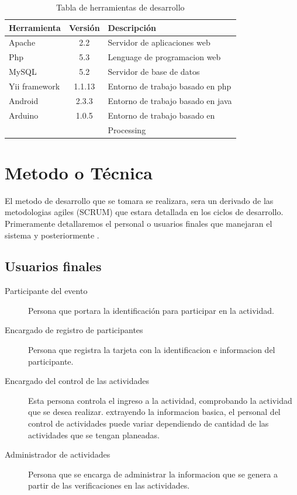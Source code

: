 \documentclass[letter,12pt]{article}
\begin{document}
	\begin{table}[H]
		\begin{tabular}{l|c|l}
			Herramienta       & Versi\'on   & Descripci\'on					   \\
			\hline
			Apache 			  & 2.2			& Servidor de aplicaciones web     \\
			Php				  & 5.3			& Lenguage de programacion web     \\
			MySQL             & 5.2			& Servidor de base de datos        \\
			Yii framework     & 1.1.13  	& Entorno de trabajo basado en php \\
			Android           & 2.3.3		& Entorno de trabajo basado en java\\
			Arduino 		  & 1.0.5		& Entorno de trabajo basado en     \\
							  &             & Processing					   \\	
		\end{tabular}
		\caption{ Tabla de herramientas de desarrollo}
		\label{herramienta_desarrollo}
	\end{table}

\section{Metodo o Técnica}

El metodo de desarrollo que se tomara se realizara, sera un derivado de las metodologias agiles (SCRUM) que estara detallada en los ciclos de desarrollo. Primeramente  detallaremos el personal o usuarios finales que manejaran el sistema y posteriormente .

	\subsection{ Usuarios finales }
	
	\begin{description}
		
		\item [Participante del evento] Persona que portara la identificaci\'on para participar en la actividad.
		\item [Encargado de registro de participantes] Persona que registra la tarjeta con la identificacion e informacion del participante.
		\item [Encargado del control de las actividades]Esta persona controla el ingreso a la actividad, comprobando la actividad que se desea realizar.  extrayendo la informacion basica, el personal del control de actividades puede variar dependiendo de cantidad de las actividades que se tengan planeadas.
		\item [Administrador de actividades] Persona que se encarga de administrar la informacion que se genera a partir de las verificaciones en las actividades.
	\end{description}
	
\end{document}
